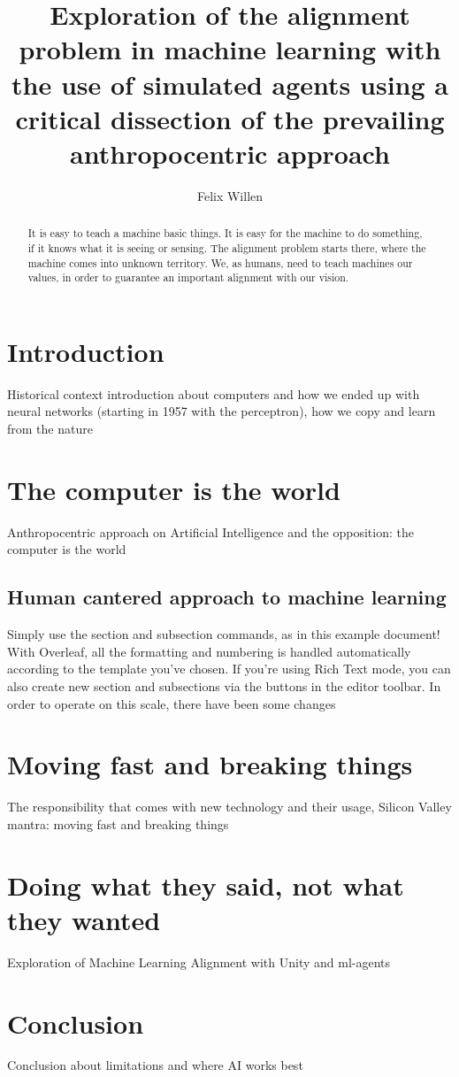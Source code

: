 \documentclass{article}
\title{Exploration of the alignment problem in machine learning with the use of simulated agents using a critical dissection of the prevailing anthropocentric approach}
\author{Felix Willen}
\begin{document}
\maketitle

\begin{abstract}
It is easy to teach a machine basic things. It is easy for the machine to do something, if it knows what it is seeing or sensing. The alignment problem starts there, where the machine comes into unknown territory. We, as humans, need to teach machines our values, in order to guarantee an important alignment with our vision.
\end{abstract}

\section{Introduction}

Historical context introduction about computers and how we ended up with neural networks (starting in 1957 with the perceptron), how we copy and learn from the nature

\section{The computer is the world}
 Anthropocentric approach on Artificial Intelligence and the opposition: the computer is the world

\subsection{Human cantered approach to machine learning}

Simply use the section and subsection commands, as in this example document! With Overleaf, all the formatting and numbering is handled automatically according to the template you've chosen. If you're using Rich Text mode, you can also create new section and subsections via the buttons in the editor toolbar. In order to operate on this scale, there have been some changes

\section{Moving fast and breaking things}

The responsibility that comes with new technology and their usage, Silicon Valley mantra: moving fast and breaking things

\section{Doing what they said, not what they wanted}

Exploration of Machine Learning Alignment with Unity and ml-agents

\section{Conclusion}

Conclusion about limitations and where AI works best

\newpage


\end{document}

